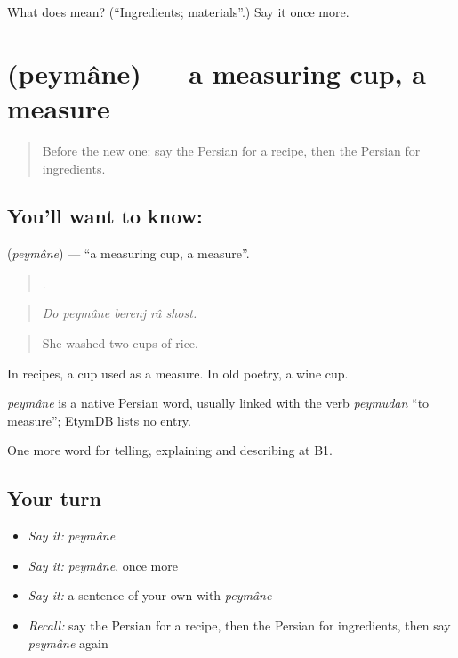 \begin{tcolorbox}[breakable,colback=teal!4,colframe=teal!35!black,title={Before you move on}]
What does  mean? (\textquotedblleft{}Ingredients; materials\textquotedblright{}.) Say it once more.
\end{tcolorbox}
\section[\texorpdfstring{\fa{پیمانه} (peymâne)}{پیمانه (peymâne)}]{ (peymâne) — a measuring cup, a measure}

\label{lesson:FA-C355-peymane}



\begin{quote}
Before the new one: say the Persian for a recipe, then the Persian for ingredients.
\end{quote}

\subsection*{You'll want to know: }
\textbf{} (\emph{peymâne}) — \textquotedblleft{}a measuring cup, a measure\textquotedblright{}.

\begin{quote}
    .
\end{quote}

\begin{quote}
\emph{Do peymâne berenj râ shost.}
\end{quote}

\begin{quote}
She washed two cups of rice.
\end{quote}

In recipes, a cup used as a measure. In old poetry, a wine cup.

\begin{cousinweb}
\emph{peymâne} is a native Persian word, usually linked with the verb \emph{peymudan} \textquotedblleft{}to measure\textquotedblright{}; EtymDB lists no entry.
\end{cousinweb}

\begin{grammarlens}[title={What you've built}]
One more word for telling, explaining and describing at B1.
\end{grammarlens}

\subsection*{Your turn}
\begin{itemize}
\raggedright
  \item \emph{Say it:} \emph{peymâne}
  \item \emph{Say it:} \emph{peymâne}, once more
  \item \emph{Say it:} a sentence of your own with \emph{peymâne}
  \item \emph{Recall:} say the Persian for a recipe, then the Persian for ingredients, then say \emph{peymâne} again
\end{itemize}

